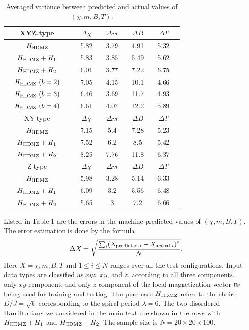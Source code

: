 \documentclass[reprint,amsmath,amssymb,aps,showpacs,superscriptaddress,prb]{revtex4-1}
\newcommand{\ba}{\begin{eqnarray}}
\newcommand{\ea}{\end{eqnarray}}
\renewcommand{\v}[1]{{\bf #1}}
\begin{document}
\begin{table}[htb]
\begin{tabular}{ | ccc || ccc  cc  cc  cc |}
\hline
 &  XYZ-type & & & $\Delta\chi$ &  & $\Delta m$ &  & $\Delta B$ & & $\Delta T$ & \\ \hline
 &  $H_{\rm HDMZ}$ & & & 5.82 &  & 3.79 &  & 4.91 & & 5.32 & \\ \hline
 & $H_{\rm HDMZ}+ H_1$  &  & & 5.83 & & 3.85 & & 5.49 & &  5.62 & \\ \hline
 & $H_{\rm HDMZ}+ H_2$ & & & 6.01 & & 3.77 & & 7.22 & & 6.75 & \\ \hline
 & $H_{\rm HDMZ} ~ (b=2)$   & & & 7.05 & & 4.15 & & 10.1 & & 4.66 & \\ \hline
 & $H_{\rm HDMZ} ~ (b=3)$ & & & 6.46 & & 3.69 & & 11.7 & & 4.93 & \\ \hline
 & $H_{\rm HDMZ} ~ (b=4)$ & & & 6.61 & & 4.07 & & 12.2 & & 5.89 & \\ \hline \hline
 &  XY-type & & & $\Delta\chi$ &  & $\Delta m$ &  & $\Delta B$ & & $\Delta T$ & \\ \hline
 &  $H_{\rm HDMZ}$ & & & 7.15 &  & 5.4 &  & 7.28 & & 5.23 & \\ \hline
 & $H_{\rm HDMZ}+ H_1$  &  & & 7.52 & & 6.2 & & 8.5 & &  5.42 & \\ \hline
 & $H_{\rm HDMZ}+ H_2$ & & & 8.25 & & 7.76 & & 11.8 & & 6.37 & \\ \hline \hline
 &  Z-type & & & $\Delta\chi$ &  & $\Delta m$ &  & $\Delta B$ & & $\Delta T$ & \\ \hline
 &  $H_{\rm HDMZ}$ & & & 5.98 &  & 3.28 &  & 5.14 & & 6.33 & \\ \hline
 & $H_{\rm HDMZ}+ H_1$  &  & & 6.09 & & 3.2 & & 5.56 & &  6.48 & \\ \hline
 & $H_{\rm HDMZ}+ H_2$ & & & 5.65 & & 3 & & 7.2 & & 6.66 & \\ \hline
\end{tabular}\label{table:1}
\caption{Averaged variance between predicted and actual values of $(\chi, m, B, T)$.}
\end{table}

Listed in Table 1 are the errors in the machine-predicted values of $(\chi, m, B, T)$. The error estimation is done by the formula
%
\ba \Delta X = \sqrt{ { \sum_i (X_{{\rm predicted}, i} - X_{{\rm actual}, i} )^2 \over N} }. \ea
%
Here $X=\chi, m, B, T$ and $1\le i \le N$ ranges over all the test configurations. Input data types are classified as $xyz$, $xy$, and $z$, according to all three components, only $xy$-component, and only $z$-component of the local magnetization vector $\v n_i$ being used for training and testing. The pure case $H_{\rm HDMZ}$ refers to the choice $D/J=\sqrt{6}$ corresponding to the spiral period $\lambda=6$. The two disordered Hamiltonians we considered in the main text are shown in the rows with $H_{\rm HDMZ}+ H_1$ and $H_{\rm HDMZ}+ H_2$. The sample size is $N= 20\times 20 \times 100$.
\end{document}
